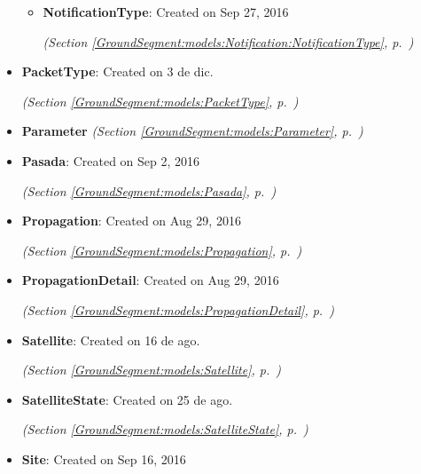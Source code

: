 \begin{itemize}
\begin{itemize}
    \item \textbf{NotificationType}: Created on Sep 27, 2016



  \textit{(Section \ref{GroundSegment:models:Notification:NotificationType}, p.~\pageref{GroundSegment:models:Notification:NotificationType})}

  \end{itemize}
\item \textbf{PacketType}: Created on 3 de dic.



  \textit{(Section \ref{GroundSegment:models:PacketType}, p.~\pageref{GroundSegment:models:PacketType})}

\item \textbf{Parameter}
  \textit{(Section \ref{GroundSegment:models:Parameter}, p.~\pageref{GroundSegment:models:Parameter})}

\item \textbf{Pasada}: Created on Sep 2, 2016



  \textit{(Section \ref{GroundSegment:models:Pasada}, p.~\pageref{GroundSegment:models:Pasada})}

\item \textbf{Propagation}: Created on Aug 29, 2016



  \textit{(Section \ref{GroundSegment:models:Propagation}, p.~\pageref{GroundSegment:models:Propagation})}

\item \textbf{PropagationDetail}: Created on Aug 29, 2016



  \textit{(Section \ref{GroundSegment:models:PropagationDetail}, p.~\pageref{GroundSegment:models:PropagationDetail})}

\item \textbf{Satellite}: Created on 16 de ago.



  \textit{(Section \ref{GroundSegment:models:Satellite}, p.~\pageref{GroundSegment:models:Satellite})}

\item \textbf{SatelliteState}: Created on 25 de ago.



  \textit{(Section \ref{GroundSegment:models:SatelliteState}, p.~\pageref{GroundSegment:models:SatelliteState})}

\item \textbf{Site}: Created on Sep 16, 2016




\end{itemize}
